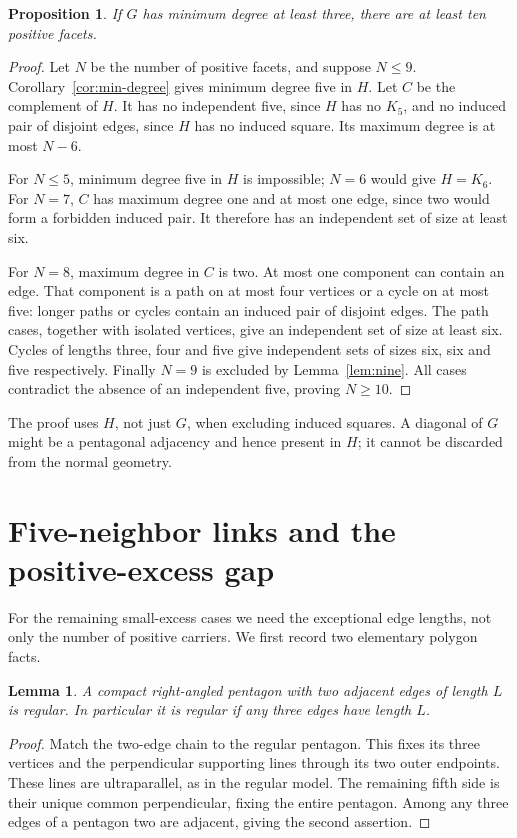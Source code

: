 \documentclass[11pt]{article}
\newtheorem{lemma}[theorem]{Lemma}
\newtheorem{proposition}[theorem]{Proposition}
\theoremstyle{remark}
\begin{document}
\begin{proposition}\label{prop:ten-positive}
If $G$ has minimum degree at least three, there are at least ten
positive facets.
\end{proposition}
\begin{proof}
Let $N$ be the number of positive facets, and suppose $N\le9$.
Corollary~\ref{cor:min-degree} gives minimum degree five in $H$.
Let $C$ be the complement of $H$. It has no independent five, since
$H$ has no $K_5$, and no induced pair of disjoint edges, since $H$
has no induced square. Its maximum degree is at most $N-6$.

For $N\le5$, minimum degree five in $H$ is impossible; $N=6$
would give $H=K_6$. For $N=7$, $C$ has maximum degree one and at
most one edge, since two would form a forbidden induced pair.
It therefore has an independent set of size at least six.

For $N=8$, maximum degree in $C$ is two. At most one component
can contain an edge. That component is a path on at most four
vertices or a cycle on at most five: longer paths or cycles contain
an induced pair of disjoint edges. The path cases, together with
isolated vertices, give an independent set of size at least six.
Cycles of lengths three, four and five give independent sets of
sizes six, six and five respectively. Finally $N=9$ is excluded by
Lemma~\ref{lem:nine}. All cases contradict the absence of an
independent five, proving $N\ge10$.
\end{proof}

The proof uses $H$, not just $G$, when excluding induced squares.
A diagonal of $G$ might be a pentagonal adjacency and hence present
in $H$; it cannot be discarded from the normal geometry.

\section{Five-neighbor links and the positive-excess gap}\label{sec:endpoint}

For the remaining small-excess cases we need the exceptional edge lengths,
not only the number of positive carriers. We first record two
elementary polygon facts.

\begin{lemma}\label{lem:pentagon-two}
A compact right-angled pentagon with two adjacent edges of length $L$
is regular. In particular it is regular if any three edges have length $L$.
\end{lemma}
\begin{proof}
Match the two-edge chain to the regular pentagon. This fixes its three
vertices and the perpendicular supporting lines through its two outer
endpoints. These lines are ultraparallel, as in the regular model.
The remaining fifth side is their unique common perpendicular, fixing
the entire pentagon. Among any three edges of a pentagon two are
adjacent, giving the second assertion.
\end{proof}
\end{document}
